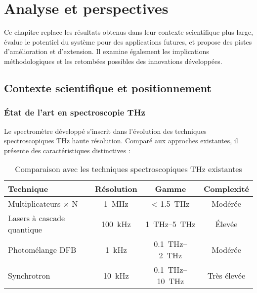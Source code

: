 
\chapter{Analyse et perspectives}
\label{chap:analyse}

Ce chapitre replace les résultats obtenus dans leur contexte scientifique plus large, évalue le potentiel du système pour des applications futures, et propose des pistes d'amélioration et d'extension. Il examine également les implications méthodologiques et les retombées possibles des innovations développées.

\section{Contexte scientifique et positionnement}

\subsection{État de l'art en spectroscopie THz}

Le spectromètre développé s'inscrit dans l'évolution des techniques spectroscopiques THz haute résolution. Comparé aux approches existantes, il présente des caractéristiques distinctives :

\begin{table}[ht]
    \centering
    \caption{Comparaison avec les techniques spectroscopiques THz existantes}
    \label{tab:comparaison_techniques}
    \begin{tabular}{lccc}
        \toprule
        \textbf{Technique} & \textbf{Résolution} & \textbf{Gamme} & \textbf{Complexité} \\
        \midrule
        Multiplicateurs × N & \SI{1}{\MHz} & < \SI{1.5}{\THz} & Modérée \\
        Lasers à cascade quantique & \SI{100}{\kHz} & \SIrange{1}{5}{\THz} & Élevée \\
        Photomélange DFB & \SI{1}{\kHz} & \SIrange{0.1}{2}{\THz} & Modérée \\
        Synchrotron & \SI{10}{\kHz} & \SIrange{0.1}{10}{\THz} & Très élevée \\
        \bottomrule
    \end{tabular}
\end{table}

